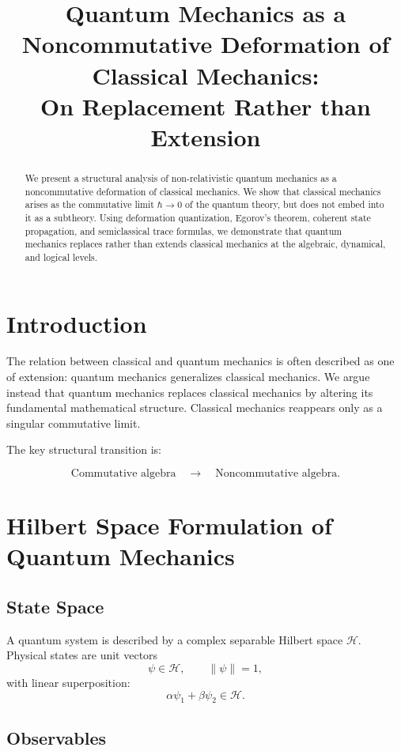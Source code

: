 \documentclass[11pt,a4paper]{article}
\title{\textbf{Quantum Mechanics as a Noncommutative Deformation of Classical Mechanics:\\
On Replacement Rather than Extension}}
\author{}
\date{}
\begin{document}
\maketitle

\begin{abstract}
We present a structural analysis of non-relativistic quantum mechanics as a noncommutative deformation of classical mechanics. We show that classical mechanics arises as the commutative limit $\hbar \to 0$ of the quantum theory, but does not embed into it as a subtheory. Using deformation quantization, Egorov's theorem, coherent state propagation, and semiclassical trace formulas, we demonstrate that quantum mechanics replaces rather than extends classical mechanics at the algebraic, dynamical, and logical levels.
\end{abstract}

\tableofcontents

\section{Introduction}

The relation between classical and quantum mechanics is often described as one of extension: quantum mechanics generalizes classical mechanics. We argue instead that quantum mechanics replaces classical mechanics by altering its fundamental mathematical structure. Classical mechanics reappears only as a singular commutative limit.

The key structural transition is:

\[
\text{Commutative algebra} \quad \longrightarrow \quad \text{Noncommutative algebra}.
\]

\section{Hilbert Space Formulation of Quantum Mechanics}

\subsection{State Space}

A quantum system is described by a complex separable Hilbert space $\mathcal H$. Physical states are unit vectors
\[
\psi \in \mathcal H, \qquad \|\psi\|=1,
\]
with linear superposition:
\[
\alpha\psi_1 + \beta\psi_2 \in \mathcal H.
\]

\subsection{Observables}
\end{document}
